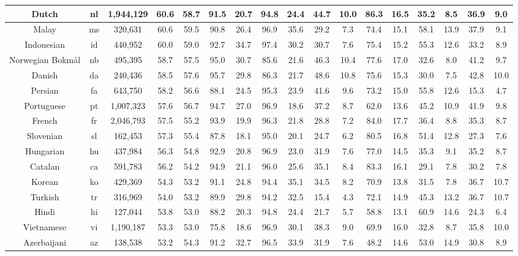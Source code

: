\begin{table*}
{\begin{tabular}{|c|c|c||c|c|c|c|c|c|c|c|c|c|c|c|c|c|}
Dutch & nl & 1,944,129 & 60.6 & 58.7 & 91.5 & 20.7 & 94.8 & 24.4 & 44.7 & 10.0 & 86.3 & 16.5 & 35.2 & 8.5 & 36.9 & 9.0\\ \hline
Malay & ms & 320,631 & 60.6 & 59.5 & 90.8 & 26.4 & 96.9 & 35.6 & 29.2 & 7.3 & 74.4 & 15.1 & 58.1 & 13.9 & 37.9 & 9.1\\ \hline
Indonesian & id & 440,952 & 60.0 & 59.0 & 92.7 & 34.7 & 97.4 & 30.2 & 30.7 & 7.6 & 75.4 & 15.2 & 55.3 & 12.6 & 33.2 & 8.9\\ \hline
Norwegian Bokmål & nb & 495,395 & 58.7 & 57.5 & 95.0 & 30.7 & 85.6 & 21.6 & 46.3 & 10.4 & 77.6 & 17.0 & 32.6 & 8.0 & 41.2 & 9.7\\ \hline
Danish & da & 240,436 & 58.5 & 57.6 & 95.7 & 29.8 & 86.3 & 21.7 & 48.6 & 10.8 & 75.6 & 15.3 & 30.0 & 7.5 & 42.8 & 10.0\\ \hline
Persian & fa & 643,750 & 58.2 & 56.6 & 88.1 & 24.5 & 95.3 & 23.9 & 41.6 & 9.6 & 73.2 & 15.0 & 55.8 & 12.6 & 15.3 & 4.7\\ \hline
Portuguese & pt & 1,007,323 & 57.6 & 56.7 & 94.7 & 27.0 & 96.9 & 18.6 & 37.2 & 8.7 & 62.0 & 13.6 & 45.2 & 10.9 & 41.9 & 9.8\\ \hline
French & fr & 2,046,793 & 57.5 & 55.2 & 93.9 & 19.9 & 96.3 & 21.8 & 28.8 & 7.2 & 84.0 & 17.7 & 36.4 & 8.8 & 35.3 & 8.7\\ \hline
Slovenian & sl & 162,453 & 57.3 & 55.4 & 87.8 & 18.1 & 95.0 & 20.1 & 24.7 & 6.2 & 80.5 & 16.8 & 51.4 & 12.8 & 27.3 & 7.6\\ \hline
Hungarian & hu & 437,984 & 56.3 & 54.8 & 92.9 & 20.8 & 96.9 & 23.0 & 31.9 & 7.6 & 77.0 & 14.5 & 35.3 & 9.1 & 35.2 & 8.7\\ \hline
Catalan & ca & 591,783 & 56.2 & 54.2 & 94.9 & 21.1 & 96.0 & 25.6 & 35.1 & 8.4 & 83.3 & 16.1 & 29.1 & 7.8 & 30.2 & 7.8\\ \hline
Korean & ko & 429,369 & 54.3 & 53.2 & 91.1 & 24.8 & 94.4 & 35.1 & 34.5 & 8.2 & 70.9 & 13.8 & 31.5 & 7.8 & 36.7 & 10.7\\ \hline
Turkish & tr & 316,969 & 54.0 & 53.2 & 89.9 & 29.8 & 94.2 & 32.5 & 15.4 & 4.3 & 72.1 & 14.9 & 45.3 & 13.2 & 36.7 & 10.7\\ \hline
Hindi & hi & 127,044 & 53.8 & 53.0 & 88.2 & 20.3 & 94.8 & 24.4 & 21.7 & 5.7 & 58.8 & 13.1 & 60.9 & 14.6 & 24.3 & 6.4\\ \hline
Vietnamese & vi & 1,190,187 & 53.3 & 53.0 & 75.8 & 18.6 & 96.9 & 30.1 & 38.3 & 9.0 & 69.9 & 16.0 & 32.8 & 8.7 & 35.8 & 10.0\\ \hline
Azerbaijani & az & 138,538 & 53.2 & 54.3 & 91.2 & 32.7 & 96.5 & 33.9 & 31.9 & 7.6 & 48.2 & 14.6 & 53.0 & 14.9 & 30.8 & 8.9\\ \hline

\end{tabular}}
\end{table*}
